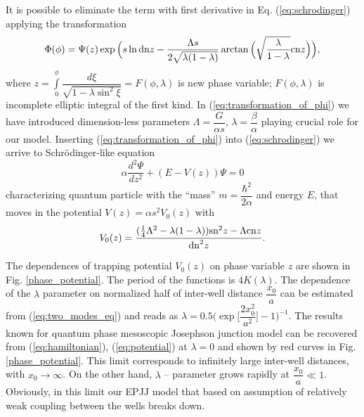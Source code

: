 \documentclass[aps, pre, preprint, groupedaddress, superscriptaddress, showkeys, showpacs] {revtex4-1}
\DeclarePairedDelimiter\ket{\lvert}{\rangle}
\begin{document}
%
%
%
%
It is possible to eliminate the term with first derivative in Eq. (\ref{eq:schrodinger}) applying the transformation
%
\begin{equation}
\Phi(\phi) = \Psi(z) \exp \Big( s \ln \textrm{dn}{z} - \dfrac{\Lambda s}{2 \sqrt{\lambda (1 - \lambda)}} \arctan \Big( \sqrt{\dfrac{\lambda}{1 - \lambda}} \textrm{cn}{z} \Big) \Big),
\label{eq:transformation_of_phi}
\end{equation}
%
where $z = \int \limits_0^\phi \dfrac{d \xi}{\sqrt{1 - \lambda \sin^2 \xi}} = F(\phi, \lambda)$ is new phase variable; $F(\phi, \lambda)$ is incomplete elliptic integral of the first kind.
In (\ref{eq:transformation_of_phi}) we have introduced dimension-less parameters $\Lambda = \dfrac{G}{\alpha s}$, $\lambda = \dfrac{\beta}{\alpha}$ playing crucial role for our model.
Inserting (\ref{eq:transformation_of_phi}) into (\ref{eq:schrodinger}) we arrive to Schr\"odinger-like equation
% 
\begin{equation}
\alpha \frac{d^2\Psi}{dz^2} + (E - V(z))\Psi = 0
\label{eq:schrodinger_usual}
\end{equation}
%
characterizing quantum particle with the ``mass''  $m = \dfrac{\hbar^2}{2 \alpha}$ and energy $E$, that moves in the potential $V(z) = \alpha s^2 V_0(z)$ with
%
\begin{equation}
V_0(z) = \frac{ (\frac{1}{4} \Lambda^2 - \lambda (1 - \lambda)) \textrm{sn}^2{z} - \Lambda \textrm{cn}{z}}{\textrm{dn}^2{z}}.
\label{eq:potential}
\end{equation}
%

The dependences of trapping potential $V_0(z)$ on phase variable $z$ are shown in Fig. \ref{phase_potential}. The period of the functions is  $4K(\lambda)$.
The dependence of the $\lambda$ parameter on normalized half of inter-well distance $\dfrac{x_0}{a}$ can be estimated from (\ref{eq:two_modes_eq}) and reads as $\lambda = 0.5 \Big( \exp \Big[ \dfrac{2 x_0^2}{a^2} \Big] - 1 \Big)^{-1}$. The results known for quantum phase mesoscopic Josephson junction model can be recovered from (\ref{eq:hamiltonian}), (\ref{eq:potential}) at $\lambda = 0$ and shown by red curves in  Fig.\ref{phase_potential}. This limit corresponds to  infinitely large inter-well distances, with $x_0 \to \infty$.
On the other hand, $\lambda$ -- parameter grows rapidly at $\dfrac{x_0}{a} \ll 1$.
Obviously, in this limit our EPJJ model that based on assumption of relatively weak coupling between the wells breaks down.
\end{document}

